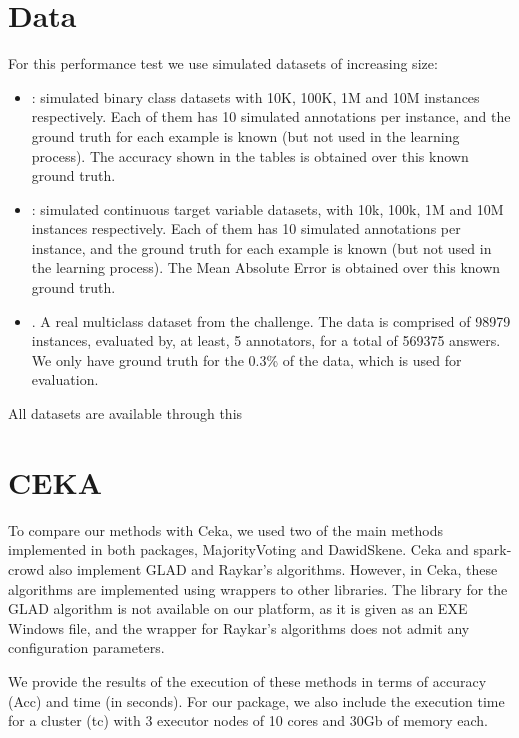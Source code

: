 \documentclass[letterpaper,10pt,english]{sphinxmanual}
\begin{document}
\section{Data}
\label{\detokenize{package/other:data}}
For this performance test we use simulated datasets of increasing size:
\begin{itemize}
\item {} 
: simulated binary class datasets with 10K, 100K, 1M and 10M instances respectively. Each of them
has 10 simulated annotations per instance, and the ground truth for each example is known (but not used in the
learning process). The accuracy shown in the tables is obtained over this known ground truth.

\item {} 
: simulated continuous target variable datasets, with 10k, 100k, 1M and 10M instances respectively. Each of them
has 10 simulated annotations per instance, and the ground truth for each example is known (but not used in the
learning process). The Mean Absolute Error is obtained over this known ground truth.

\item {} 
. A real multiclass dataset from the  challenge. The data is comprised of 98979 instances,
evaluated by, at least, 5 annotators, for a total of 569375 answers. We only have ground truth for the 0.3\% of the data,
which is used for evaluation.

\end{itemize}

All datasets are available through this 


\section{CEKA}
\label{\detokenize{package/other:id1}}
To compare our methods with Ceka, we used two of the main methods implemented in both packages, MajorityVoting and DawidSkene. Ceka and
spark-crowd also implement GLAD and Raykar’s algorithms. However, in Ceka, these algorithms are implemented using wrappers to other libraries.
The library for the GLAD algorithm is not available on our platform, as it is given as an EXE Windows file, and the wrapper for Raykar’s algorithms
does not admit any configuration parameters.

We provide the results of the execution of these methods in terms of accuracy (Acc) and time (in seconds). For our package, we also include
the execution time for a cluster (tc) with 3 executor nodes of 10 cores and 30Gb of memory each.
\end{document}
